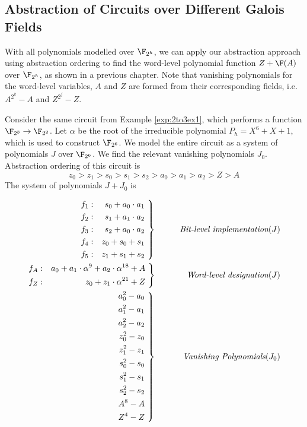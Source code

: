 \subsection{Abstraction of Circuits over Different Galois Fields}

With all polynomials modelled over $\F_{2^h}$, we can apply our abstraction
approach using abstraction ordering to find the word-level polynomial
function $Z+\F(A)$ over $\F_{2^h}$, as shown in a previous chapter. Note that
vanishing polynomials for the word-level variables, $A$ and $Z$ are formed 
from their corresponding fields, i.e. $A^{2^k}-A$ and $Z^{2^j}-Z$.

\begin{Example}
Consider the same circuit from Example \ref{exp:2to3ex1}, which performs a
function $\F_{2^3} \rightarrow \F_{2^2}$.
Let $\alpha$ be the root of the irreducible polynomial $P_h=X^6+X+1$, which
is used to construct $\F_{2^6}$.
We model the entire circuit as a system of polynomials $J$ over $\F_{2^6}$.
We find the relevant vanishing polynomials $J_0$. Abstraction ordering of 
this circuit is
\begin{equation}
z_0>z_1>s_0>s_1>s_2>a_0>a_1>a_2>Z>A \nonumber
\end{equation}
The system of polynomials $J+J_0$ is

\begin{eqnarray}\label{eqn:miterbit}
 \left .  \begin{aligned}
f_1&:&s_0+a_0\cdot a_1\nonumber\\
f_2&:&s_1+a_1\cdot a_2\nonumber\\
f_3&:&s_2+a_0\cdot a_2\nonumber\\
f_4&:&z_0+s_0+s_1\nonumber\\
f_5&:&z_1+s_1+s_2\nonumber\\
\end{aligned}
\ \right\}
&\qquad&  \text{\it Bit-level implementation} (J) \nonumber \\
 \left .  \begin{aligned}
f_A&:&a_0+a_1\cdot\alpha^9+a_2\cdot\alpha^{18}+A\nonumber\\
f_Z&:&z_0+z_1\cdot\alpha^{21}+Z\nonumber\\ 
\end{aligned}
\ \right\}
 &\qquad&  \text{\it Word-level designation} (J) \nonumber \\
\left . \begin{aligned}
a_0^2-a_0\nonumber\\
a_1^2-a_1\nonumber\\
a_2^2-a_2\nonumber\\
z_0^2-z_0\nonumber\\
z_1^2-z_1\nonumber\\
s_0^2-s_0\nonumber\\
s_1^2-s_1\nonumber\\
s_2^2-s_2\nonumber\\
A^8-A\nonumber\\
Z^4-Z\nonumber
\end{aligned}
\ \right\}
&\qquad&  \text{\it Vanishing Polynomials} (J_0) \nonumber 
\end{eqnarray}


\end{Example}
